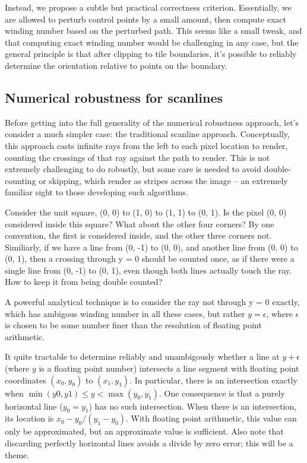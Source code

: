 \documentclass[format=acmsmall]{acmart}
\begin{document}
Instead, we propose a subtle but practical correctness criterion. Essentially, we are allowed to perturb control points by a small amount, then compute exact winding number based on the perturbed path. This seems like a small tweak, and that computing exact winding number would be challenging in any case, but the general principle is that after clipping to tile boundaries, it's possible to reliably determine the orientation relative to points on the boundary.

\subsection{Numerical robustness for scanlines}

Before getting into the full generality of the numerical robustness approach, let's consider a much simpler case: the traditional scanline approach. Conceptually, this approach casts infinite rays from the left to each pixel location to render, counting the crossings of that ray against the path to render. This is not extremely challenging to do robustly, but some care is needed to avoid double-counting or skipping, which render as stripes across the image – an extremely familiar sight to those developing such algorithms.

Consider the unit square, (0, 0) to (1, 0) to (1, 1) to (0, 1). Is the pixel (0, 0) considered inside this square? What about the other four corners? By one convention, the first is considered inside, and the other three corners not. Similiarly, if we have a line from (0, -1) to (0, 0), and another line from (0, 0) to (0, 1), then a crossing through y = 0 should be counted once, as if there were a single line from (0, -1) to (0, 1), even though both lines actually touch the ray. How to keep it from being double counted?

A powerful analytical technique is to consider the ray not through y = 0 exactly, which has ambigous winding number in all these cases, but rather $y = \epsilon$, where $\epsilon$ is chosen to be some number finer than the resolution of floating point arithmetic.

It quite tractable to determine reliably and unambigously whether a line at $y+\epsilon$ (where $y$ is a floating point number) intersects a line segment with floating point coordinates $(x_0, y_0)$ to $(x_1, y_1)$. In particular, there is an intersection exactly when $\min(y0, y1) \leq y < \max(y_0, y_1)$. One consequence is that a purely horizontal line ($y_0 = y_1$) has no such intersection. When there is an intersection, its location is $x_0 - y_0/(y_1 - y_0)$. With floating point arithmetic, this value can only be approximated, but an approximate value is sufficient. Also note that discarding perfectly horizontal lines avoids a divide by zero error; this will be a theme.
\end{document}
